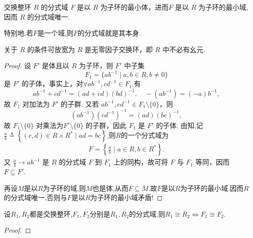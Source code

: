 \documentclass[../../main.tex]{subfiles}%
\begin{document}
\begin{theorem}\label{theorem:分式域是包含R的最小域且唯一}
交换整环 \( R \) 的分式域 \( F \) 是以 \( R \) 为子环的最小体，进而\( F \) 是以 \( R \) 为子环的最小域,因而 \( R \) 的分式域唯一.

特别地,若$F$是一个域,则$F$的分式域就是其本身.
\end{theorem}
\begin{remark}
关于 \( R \) 的条件可放宽为 \( R \) 是无零因子交换环，即 \( R \) 中不必有幺元.
\end{remark}
\begin{proof}
设 \( F' \) 是体且以 \( R \) 为子环，则 \( F' \) 中子集
\[
F_1 = \{ab^{-1} \mid a, b \in R, b \neq 0\}
\]
是 \( F' \) 的子体，事实上，对$\forall ab^{-1}, cd^{-1} \in F_1$,有
\[
ab^{-1} + cd^{-1} = (ad + cd)(bd)^{-1}, \quad -(ab^{-1}) = (-a)b^{-1},
\]
故 \( F_1 \) 对加法为 \( F' \) 的子群. 又若 \( ab^{-1}, cd^{-1} \in F_1 \setminus \{0\} \)，则
\[
(ab^{-1})(cd^{-1})^{-1} = (ad)(bc)^{-1},
\]
故 \( F_1 \setminus \{0\} \) 对乘法为\( F' \setminus \{0\} \) 的子群，因此 \( F_1 \) 是 \( F' \) 的子体. 由知,记$\frac{a}{b}\triangleq \left\{ \left( c,d \right) \in R\times R^*\mid ad=bc \right\}$,则$R$的一个分式域为
\begin{align*}
F=\left\{ \frac{a}{b}\mid a\in R,b\in R^* \right\} .
\end{align*}
又 \( \frac{a}{b} \to ab^{-1} \) 是 \( R \) 的分式域 \( F \) 到 \( F_1 \) 上的同构，故可将 \( F \) 与 \( F_1 \) 等同，因而 \( F \subseteq F' \).

再设$M$是以$R$为子环的域,则$M$也是体,从而$F\subseteq M$.故$F$是以$R$为子环的最小域.因而$R$的分式域唯一,否则与$F$是以$R$为子环的最小域矛盾!
\end{proof}

\begin{corollary}\label{corollary:分式域同构等价于生成环同构}
设$R_1,R_2$都是交换整环,$F_1,F_2$分别是$R_1,R_2$的分式域,则$R_1\cong R_2\iff F_1\cong F_2$.
\end{corollary}
\begin{proof}

\end{proof}
\end{document}
